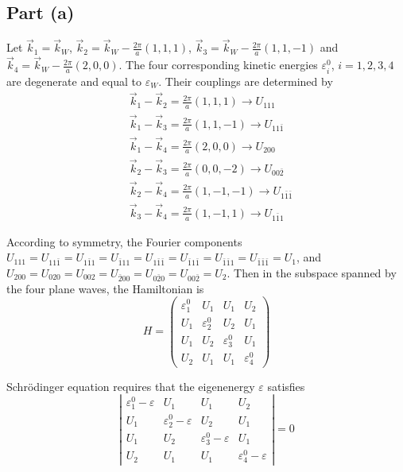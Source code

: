 \documentclass{article}
\begin{document}
\subsection{Part (a)}
Let $\vec{k}_1=\vec{k}_W$, $\vec{k}_2=\vec{k}_W-\frac{2\pi}{a}(1,1,1)$, $\vec{k}_3=\vec{k}_W-\frac{2\pi}{a}(1,1,-1)$ and $\vec{k}_4=\vec{k}_W-\frac{2\pi}{a}(2,0,0)$. The four corresponding kinetic energies $\varepsilon_i^0$, $i=1,2,3,4$ are degenerate and equal to $\varepsilon_W$. Their couplings are determined by
\begin{align*}
&\vec{k}_1-\vec{k}_2=\frac{2\pi}{a}(1,1,1)\rightarrow U_{111}\\
&\vec{k}_1-\vec{k}_3=\frac{2\pi}{a}(1,1,-1)\rightarrow U_{11\bar{1}}\\
&\vec{k}_1-\vec{k}_4=\frac{2\pi}{a}(2,0,0)\rightarrow U_{200}\\
&\vec{k}_2-\vec{k}_3=\frac{2\pi}{a}(0,0,-2)\rightarrow U_{00\bar{2}}\\
&\vec{k}_2-\vec{k}_4=\frac{2\pi}{a}(1,-1,-1)\rightarrow U_{1\bar{1}\bar{1}}\\
&\vec{k}_3-\vec{k}_4=\frac{2\pi}{a}(1,-1,1)\rightarrow U_{1\bar{1}1}
\end{align*}

According to symmetry, the Fourier components $U_{111}=U_{11\bar{1}}=U_{1\bar{1}1}=U_{\bar{1}11}=U_{1\bar{1}\bar{1}}=U_{\bar{1}1\bar{1}}=U_{\bar{1}\bar{1}1}=U_{\bar{1}\bar{1}\bar{1}}=U_1$, and $U_{200}=U_{020}=U_{002}=U_{\bar{2}00}=U_{0\bar{2}0}=U_{00\bar{2}}=U_2$. Then in the subspace spanned by the four plane waves, the Hamiltonian is
\begin{equation*}
H=\left(\begin{array}{cccc}\varepsilon_1^0&U_1&U_1&U_2\\U_1&\varepsilon_2^0&U_2&U_1\\U_1&U_2&\varepsilon_3^0&U_1\\U_2&U_1&U_1&\varepsilon_4^0\end{array}\right)
\end{equation*}

Schr\"{o}dinger equation requires that the eigenenergy $\varepsilon$ satisfies
\begin{equation*}
\left|\begin{array}{cccc}\varepsilon_1^0-\varepsilon&U_1&U_1&U_2\\U_1&\varepsilon_2^0-\varepsilon&U_2&U_1\\U_1&U_2&\varepsilon_3^0-\varepsilon&U_1\\U_2&U_1&U_1&\varepsilon_4^0-\varepsilon\end{array}\right|=0
\end{equation*}
\end{document}
